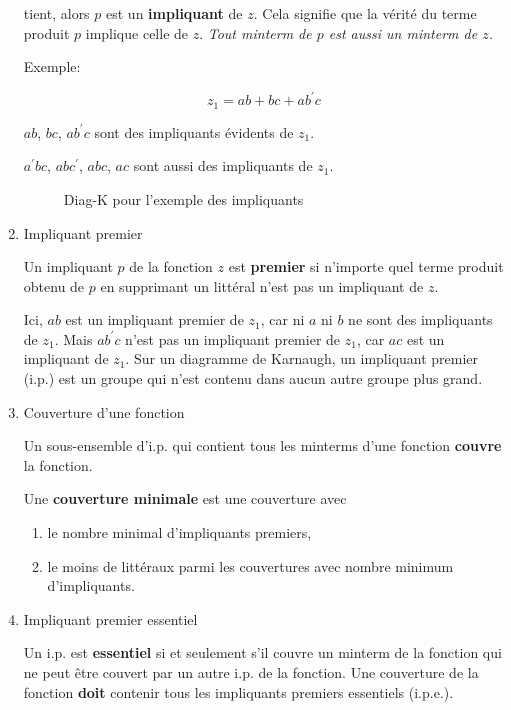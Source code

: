\documentclass[letter, oneside]{book}
\begin{document}
\begin{enumerate}
tient, alors \(p\) est un \textbf{impliquant} de \(z\). Cela signifie que la
vérité du terme produit \(p\) implique celle de \(z\). \emph{Tout minterm de
\(p\) est aussi un minterm de \(z\).}

Exemple:

$$z_1 = ab + bc + a b^{\prime} c$$ 

\(a b\), \(b c\), \(a b^{\prime} c\) sont des impliquants évidents de \(z_1\).

\(a^{\prime} b c\), \(a b c^{\prime}\), \(a b c\), \(a c\) sont aussi des
impliquants de \(z_1\).

\begin{figure}[htbp]
\centering

\caption{\label{fig:org47e5a71}Diag-K pour l'exemple des impliquants}
\end{figure}

\item Impliquant premier
\label{sec:org2890e80}

Un impliquant \(p\) de la fonction \(z\) est \textbf{premier} si n'importe quel
terme produit obtenu de \(p\) en supprimant un littéral n'est pas un
impliquant de \(z\).

Ici, \(a b\) est un impliquant premier de \(z_1\), car ni \(a\) ni \(b\) ne
sont des impliquants de \(z_1\). Mais \(a b^{\prime} c\) n'est pas un
impliquant premier de \(z_1\), car \(a c\) est un impliquant de \(z_1\).
Sur un diagramme de Karnaugh, un impliquant premier (i.p.) est un
groupe qui n'est contenu dans aucun autre groupe plus grand.

\item Couverture d'une fonction
\label{sec:org6cad502}

Un sous-ensemble d'i.p. qui contient tous les minterms d'une fonction
\textbf{couvre} la fonction.

Une \textbf{couverture minimale} est une couverture avec

\begin{enumerate}
\item le nombre minimal d'impliquants premiers,

\item le moins de littéraux parmi les couvertures avec nombre minimum
d'impliquants.
\end{enumerate}

\item Impliquant premier essentiel
\label{sec:orgdf6e9ef}

Un i.p. est \textbf{essentiel} si et seulement s'il couvre un minterm de la
fonction qui ne peut être couvert par un autre i.p. de la fonction.
Une couverture de la fonction \textbf{doit} contenir tous les impliquants
premiers essentiels (i.p.e.).


\end{enumerate}
\end{document}
